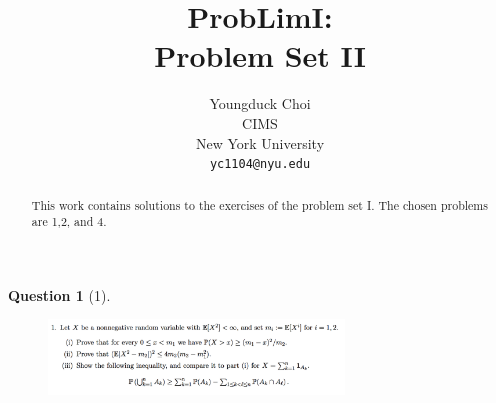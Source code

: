 \documentclass{article} %
\title{ProbLimI: \\
Problem Set II}
\author{
Youngduck Choi \\
CIMS \\
New York University\\
\texttt{yc1104@nyu.edu} \\
}
\theoremstyle{quest}
\newtheorem*{question}{Question}
\begin{document}
\maketitle

\begin{abstract}
This work contains solutions to the exercises of the problem set I. The
chosen problems are 1,2, and 4.
\end{abstract}

\bigskip

\begin{question}[1]
\hfill
\begin{figure}[h!]
  \centering
    \includegraphics[width=0.7\textwidth]{problim-e2-p1.png}
\end{figure}
\end{question}
\end{document}

